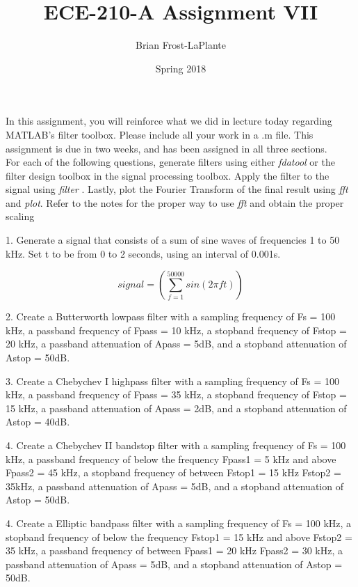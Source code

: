 \documentclass[11pt]{article}
\title{ECE-210-A Assignment VII}
\author{Brian Frost-LaPlante}
\date{Spring 2018}
\begin{document}
\maketitle
In this assignment, you will reinforce what we did in lecture today regarding MATLAB's filter toolbox. Please include all your work in a .m file. This assignment is due in two weeks, and has been assigned in all three sections.\\

For each of the following questions, generate filters using either \emph{fdatool} or the filter design toolbox in the signal processing toolbox. Apply the filter to the signal using \emph{filter} . Lastly, plot the Fourier Transform of the final result using \emph{fft} and \emph{plot}. Refer to the notes for the proper way to use \emph{fft} and obtain the proper scaling

1. Generate a signal that consists of a sum of sine waves of frequencies 1 to 50 kHz. Set t to be from 0 to 2 seconds, using an interval of 0.001s. 

$$ signal = (\sum_{f=1}^{50000} sin(2\pi ft))$$

2. Create a Butterworth lowpass filter with a sampling frequency of Fs = 100 kHz, a passband frequency of Fpass = 10 kHz, a stopband frequency of Fstop = 20 kHz, a passband attenuation of Apass = 5dB, and a stopband attenuation of Astop = 50dB.

3. Create a Chebychev I highpass filter with a sampling frequency of Fs = 100 kHz, a passband frequency of Fpass = 35 kHz, a stopband frequency of Fstop = 15 kHz, a passband attenuation of Apass = 2dB, and a stopband attenuation of Astop = 40dB.

4. Create a Chebychev II bandstop filter with a sampling frequency of Fs = 100 kHz, a passband frequency of below the frequency Fpass1 = 5 kHz and above Fpass2 = 45 kHz, a stopband frequency of between Fstop1 = 15 kHz Fstop2 = 35kHz, a passband attenuation of Apass = 5dB, and a stopband attenuation of Astop = 50dB.

4. Create a Elliptic bandpass filter with a sampling frequency of Fs = 100 kHz, a stopband frequency of below the frequency Fstop1 = 15 kHz and above Fstop2 = 35 kHz, a passband frequency of between Fpass1 = 20 kHz Fpass2 = 30 kHz, a passband attenuation of Apass = 5dB, and a stopband attenuation of Astop = 50dB.
\end{document}
